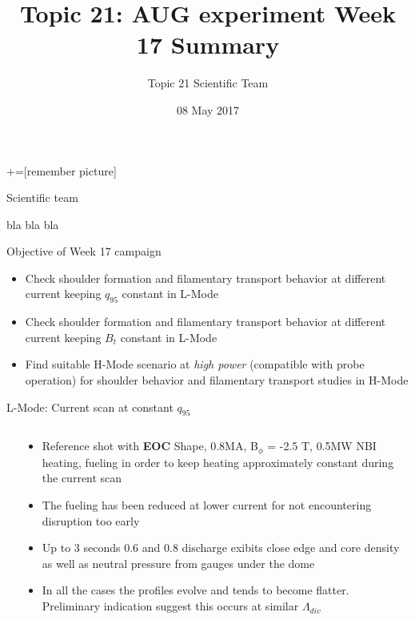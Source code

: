 \documentclass[10pt, compress]{beamer}
\title{Topic 21: AUG experiment Week 17 Summary}
\date{08 May 2017}
\author[Topic 21 Scientific Team]{Topic 21 Scientific Team}
\newcommand\Fontvi{\fontsize{8}{7.2}\selectfont}
\begin{document}
+=[remember picture]
\maketitle
\begin{frame}{Scientific team}
  \begin{center}
bla bla bla
  \end{center}
\end{frame}
\begin{frame}{Objective of Week 17 campaign}
  \begin{itemize}[<+-|alert@+>]
    \item Check shoulder formation and filamentary transport behavior
      at different current keeping $q_{95}$ constant in L-Mode
    \item Check shoulder formation and filamentary transport behavior
      at different current keeping $B_{t}$ constant in L-Mode
    \item Find suitable H-Mode scenario at \emph{high power}
      (compatible with probe operation) for shoulder behavior and
      filamentary transport studies in H-Mode
  \end{itemize}    
\end{frame}
\begin{frame}{L-Mode: Current scan at constant $q_{95}$}
\Fontvi
  \vspace{-1cm}
\begin{columns}
  \begin{column}{0.5\textwidth}
  \end{column}
  \begin{column}{0.5\textwidth}
    \begin{itemize}
      \item Reference shot with \textbf{EOC} Shape, 0.8MA, B$_{\phi}$ = -2.5 T, 0.5MW NBI heating,
        fueling in order to keep heating approximately constant during
        the current scan
      \item<2-> The fueling has been reduced at lower current for not
        encountering disruption too early
      \item<3-> Up to 3 seconds 0.6 and 0.8 discharge exibits close
        edge and core density as well as neutral pressure from gauges
        under the dome
      \item<4> In all the cases the profiles evolve and tends to
        become flatter. Preliminary indication suggest this occurs at
        similar $\Lambda_{div}$
    \end{itemize}
  
  \end{column}
\end{columns}
\end{frame}
\end{document}

